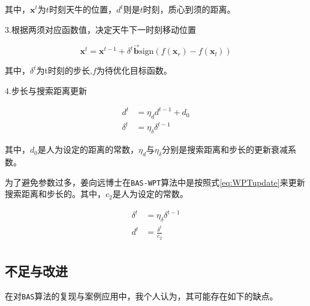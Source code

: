 \documentclass[]{ctexbook}
\theoremstyle{definition}
\theoremstyle{definition}
\theoremstyle{definition}
\theoremstyle{remark}
\begin{document}
其中，\(\mathbf{x}^t\)为\(t\)时刻天牛的位置，\(d^t\)则是\(t\)时刻，质心到须的距离。

3.根据两须对应函数值，决定天牛下一时刻移动位置

\begin{equation}
\mathbf{x}^t=\mathbf{x}^{t-1}+\delta^t\overrightarrow{\mathbf{b}}\text{sign}(f(\mathbf{x}_r)-f(\mathbf{x}_l))
\label{eq:xupdate}
\end{equation}

其中，\(\delta^t\)为t时刻的步长,\(f\)为待优化目标函数。

4.步长与搜索距离更新

\begin{align}
d^t&= \eta_d d^{t-1}+d_0 \label{eq:dupdate}\\
\delta^t&=\eta_{\delta} \delta^{t-1} \label{eq:deltaupdate}
\end{align}

其中，\(d_0\)是人为设定的距离的常数，\(\eta_d\)与\(\eta_\delta\)分别是搜索距离和步长的更新衰减系数。

为了避免参数过多，姜向远博士在\texttt{BAS-WPT}算法中是按照式\eqref{eq:WPTupdate}来更新搜索距离和步长的。其中，\(c_2\)是人为设定的常数。

\begin{equation}
\begin{split}
\delta^t&=\eta_{\delta} \delta^{t-1}\\
d^t &= \frac{\delta^t}{c_2}\\
\label{eq:WPTupdate} 
\end{split}
\end{equation}

\subsection{不足与改进}\label{BASimprove}

在对\texttt{BAS}算法的复现与案例应用中，我个人认为，其可能存在如下的缺点。
\end{document}
